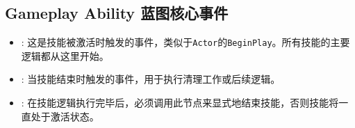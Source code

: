 \documentclass[10pt,CJKmath]{zhbook-v1}
\begin{document}
\subsection{Gameplay Ability 蓝图核心事件}
\begin{itemize}
    \item {}: 这是技能被激活时触发的事件，类似于\texttt{Actor}的\texttt{BeginPlay}。所有技能的主要逻辑都从这里开始。
    \item {}: 当技能结束时触发的事件，用于执行清理工作或后续逻辑。
    \item {}: 在技能逻辑执行完毕后，必须调用此节点来显式地结束技能，否则技能将一直处于激活状态。
\end{itemize}
\end{document}
